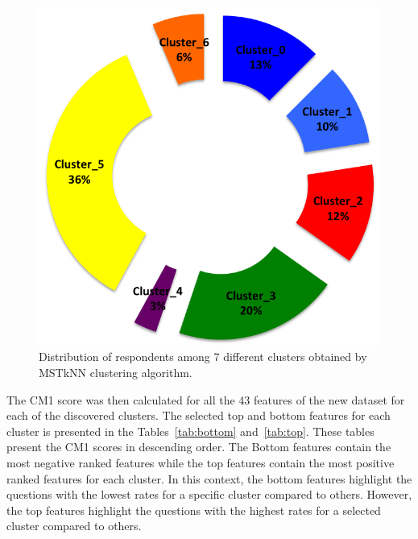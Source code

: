 \documentclass{article}
\begin{document}
\begin{figure}[h]
	\includegraphics[scale=0.5]{Clusters.png}
	\caption{Distribution of respondents among 7 different clusters obtained
	by MSTkNN clustering algorithm.}
	\label{fig:Clusters}
\end{figure}

The CM1 score was then calculated for all the 43 features of the new dataset
for each of the discovered clusters. The selected top and bottom features for
each cluster is presented in the Tables~\ref{tab:bottom} and~\ref{tab:top}.
These tables present the CM1 scores in descending order. The Bottom features
contain the most negative ranked features while the top features contain the
most positive ranked features for each cluster. In this context, the bottom
features highlight the questions with the lowest rates for a specific cluster
compared to others. However, the top features highlight the questions with the
highest rates for a selected cluster compared to others.	
\end{document}
